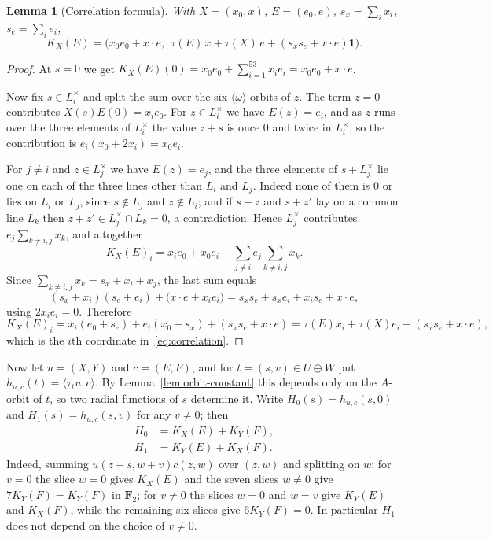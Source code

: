 \documentclass[11pt]{article}
\newtheorem{lemma}[theorem]{Lemma}
\theoremstyle{definition}
\theoremstyle{remark}
\newcommand{\F}{\mathbf F}
\newcommand{\one}{\mathbf 1}
\begin{document}
\begin{lemma}[Correlation formula]\label{lem:correlation}
With $X=(x_0,x)$, $E=(e_0,e)$, $s_x=\sum_ix_i$, $s_e=\sum_ie_i$,
\begin{equation}\label{eq:correlation}
 K_X(E)=
 \bigl(
 x_0e_0+x\cdot e,\ \
 \tau(E)\,x+\tau(X)\,e+(s_xs_e+x\cdot e)\one
 \bigr).
\end{equation}
\end{lemma}

\begin{proof}
At $s=0$ we get
$K_X(E)(0)=x_0e_0+\sum_{i=1}^53x_ie_i=x_0e_0+x\cdot e$.

Now fix $s\in L_i^\times$ and split the sum over the six
$\langle\omega\rangle$-orbits of $z$.  The term $z=0$ contributes
$X(s)E(0)=x_ie_0$.  For $z\in L_i^\times$ we have $E(z)=e_i$, and as
$z$ runs over the three elements of $L_i^\times$ the value $z+s$ is
once $0$ and twice in $L_i^\times$; so the contribution is
$e_i(x_0+2x_i)=x_0e_i$.

For $j\neq i$ and $z\in L_j^\times$ we have $E(z)=e_j$, and the three
elements of $s+L_j^\times$ lie one on each of the three lines other
than $L_i$ and $L_j$.  Indeed none of them is $0$ or lies on $L_i$ or
$L_j$, since $s\notin L_j$ and $z\notin L_i$; and if $s+z$ and $s+z'$
lay on a common line $L_k$ then $z+z'\in L_j^\times\cap L_k=0$, a
contradiction.  Hence $L_j^\times$ contributes
$e_j\sum_{k\neq i,j}x_k$, and altogether
\[
 K_X(E)_i=x_ie_0+x_0e_i+\sum_{j\neq i}e_j\sum_{k\neq i,j}x_k .
\]
Since $\sum_{k\neq i,j}x_k=s_x+x_i+x_j$, the last sum equals
\[
 (s_x+x_i)(s_e+e_i)+\bigl(x\cdot e+x_ie_i\bigr)
 =s_xs_e+s_xe_i+x_is_e+x\cdot e ,
\]
using $2x_ie_i=0$.  Therefore
\[
 K_X(E)_i=x_i(e_0+s_e)+e_i(x_0+s_x)+(s_xs_e+x\cdot e)
 =\tau(E)x_i+\tau(X)e_i+(s_xs_e+x\cdot e),
\]
which is the $i$th coordinate in~\eqref{eq:correlation}.
\end{proof}

Now let $u=(X,Y)$ and $c=(E,F)$, and for $t=(s,v)\in U\oplus W$ put
$h_{u,c}(t)=\langle\tau_tu,c\rangle$.  By
Lemma~\ref{lem:orbit-constant} this depends only on the $A$-orbit of
$t$, so two radial functions of $s$ determine it.  Write
$H_0(s)=h_{u,c}(s,0)$ and $H_1(s)=h_{u,c}(s,v)$ for any $v\neq0$; then
\begin{align}
 H_0&=K_X(E)+K_Y(F),\label{eq:H0}\\
 H_1&=K_Y(E)+K_X(F).\label{eq:H1}
\end{align}
Indeed, summing $u(z+s,w+v)c(z,w)$ over $(z,w)$ and splitting on $w$:
for $v=0$ the slice $w=0$ gives $K_X(E)$ and the seven slices $w\neq0$
give $7K_Y(F)=K_Y(F)$ in $\F_2$; for $v\neq0$ the slices $w=0$ and
$w=v$ give $K_Y(E)$ and $K_X(F)$, while the remaining six slices give
$6K_Y(F)=0$.  In particular $H_1$ does not depend on the choice of
$v\neq0$.
\end{document}
